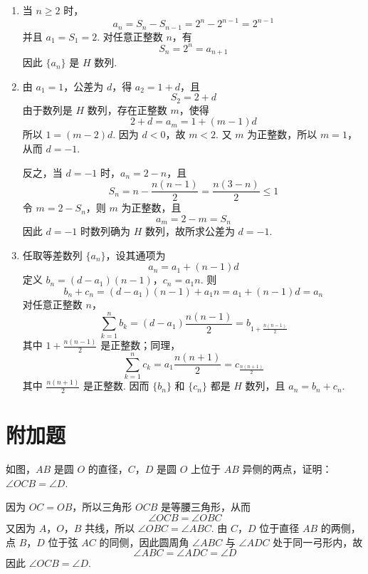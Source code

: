 \begin{solution}
\begin{enumerate}
\item 当 \(n\geqslant2\) 时，
\[
a_n=S_n-S_{n-1}=2^n-2^{n-1}=2^{n-1}
\]
并且 \(a_1=S_1=2\). 对任意正整数 \(n\)，有
\[
S_n=2^n=a_{n+1}
\]
因此 \(\{a_n\}\) 是 \(H\) 数列.

\item 由 \(a_1=1\)，公差为 \(d\)，得 \(a_2=1+d\)，且
\[
S_2=2+d
\]
由于数列是 \(H\) 数列，存在正整数 \(m\)，使得
\[
2+d=a_m=1+(m-1)d
\]
所以 \(1=(m-2)d\). 因为 \(d<0\)，故 \(m<2\). 又 \(m\) 为正整数，所以 \(m=1\)，从而 \(d=-1\).

反之，当 \(d=-1\) 时，\(a_n=2-n\)，且
\[
S_n=n-\frac{n(n-1)}2=\frac{n(3-n)}2\leqslant1
\]
令 \(m=2-S_n\)，则 \(m\) 为正整数，且
\[
a_m=2-m=S_n
\]
因此 \(d=-1\) 时数列确为 \(H\) 数列，故所求公差为 \(d=-1\).

\item 任取等差数列 \(\{a_n\}\)，设其通项为
\[
a_n=a_1+(n-1)d
\]
定义 \(b_n=(d-a_1)(n-1)\)，\(c_n=a_1n\).
则
\[
b_n+c_n=(d-a_1)(n-1)+a_1n=a_1+(n-1)d=a_n
\]
对任意正整数 \(n\)，
\[
\sum_{k=1}^n b_k=(d-a_1)\frac{n(n-1)}2=b_{1+\frac{n(n-1)}2}
\]
其中 \(1+\frac{n(n-1)}2\) 是正整数；同理，
\[
\sum_{k=1}^n c_k=a_1\frac{n(n+1)}2=c_{\frac{n(n+1)}2}
\]
其中 \(\frac{n(n+1)}2\) 是正整数. 因而 \(\{b_n\}\) 和 \(\{c_n\}\) 都是 \(H\) 数列，且 \(a_n=b_n+c_n\).
\end{enumerate}
\end{solution}

\section{附加题}

\begin{problem}[A]
如图，\(AB\) 是圆 \(O\) 的直径，\(C\)，\(D\) 是圆 \(O\) 上位于 \(AB\) 异侧的两点，证明： \( \angle OCB = \angle D \).

\end{problem}

\begin{solution}
因为 \(OC=OB\)，所以三角形 \(OCB\) 是等腰三角形，从而
\[
\angle OCB=\angle OBC
\]
又因为 \(A\)，\(O\)，\(B\) 共线，所以 \(\angle OBC=\angle ABC\). 由 \(C\)，\(D\) 位于直径 \(AB\) 的两侧，点 \(B\)，\(D\) 位于弦 \(AC\) 的同侧，因此圆周角 \(\angle ABC\) 与 \(\angle ADC\) 处于同一弓形内，故
\[
\angle ABC=\angle ADC=\angle D
\]
因此 \(\angle OCB=\angle D\).
\end{solution}

